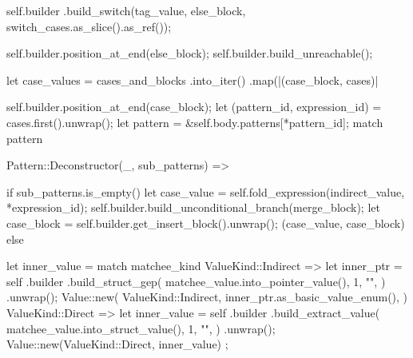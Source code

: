 \documentclass[
  oneside,
  english,
  coorientadorbanca,
  noabntexcite
]{ufsc-thesis-rn46-2019}
\begin{document}
\begin{rustcode}
{{{{                self.builder
                    .build_switch(tag_value, else_block, switch_cases.as_slice().as_ref());

                self.builder.position_at_end(else_block);
                self.builder.build_unreachable();

                let case_values = cases_and_blocks
                    .into_iter()
                    .map(|(case_block, cases)| {
                        self.builder.position_at_end(case_block);
                        let (pattern_id, expression_id) = cases.first().unwrap();
                        let pattern = &self.body.patterns[*pattern_id];
                        match pattern {
                            Pattern::Deconstructor(_, sub_patterns) => {
                                if sub_patterns.is_empty() {
                                    let case_value =
                                        self.fold_expression(indirect_value, *expression_id);
                                    self.builder.build_unconditional_branch(merge_block);
                                    let case_block = self.builder.get_insert_block().unwrap();
                                    (case_value, case_block)
                                } else {
                                    let inner_value = match matchee_kind {
                                        ValueKind::Indirect => {
                                            let inner_ptr = self
                                                .builder
                                                .build_struct_gep(
                                                    matchee_value.into_pointer_value(),
                                                    1,
                                                    "",
                                                )
                                                .unwrap();
                                            Value::new(
                                                ValueKind::Indirect,
                                                inner_ptr.as_basic_value_enum(),
                                            )
                                        }
                                        ValueKind::Direct => {
                                            let inner_value = self
                                                .builder
                                                .build_extract_value(
                                                    matchee_value.into_struct_value(),
                                                    1,
                                                    "",
                                                )
                                                .unwrap();
                                            Value::new(ValueKind::Direct, inner_value)
                                        }
                                    };

}}}}}}}}
\end{rustcode}
\end{document}
